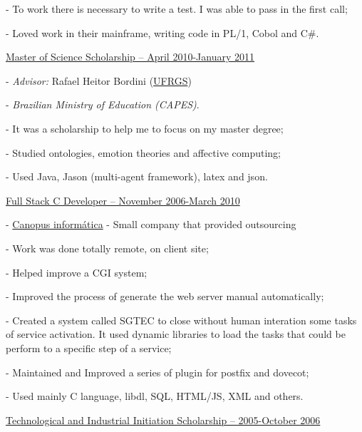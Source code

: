 \documentclass[12pt,oneside,a4paper]{article}
\begin{document}
\begin{compactitem}
\begin{compactitem}
      \item [-] To work there is necessary to write a test. I was able to pass in the first call;
      \item [-] Loved work in their mainframe, writing code in PL/1, Cobol and C\#.
    \end{compactitem}
	\item \underline{Master of Science Scholarship – April 2010-January 2011}
    \begin{compactitem}
      \item [-] \textit{Advisor:} Rafael Heitor Bordini (\href{http://www.ufrgs.br}{UFRGS})
      \item [-] \textit{Brazilian Ministry of Education (CAPES)}.
      \item [-] It was a scholarship to help me to focus on my master degree;
      \item [-] Studied ontologies, emotion theories and affective computing;
      \item [-] Used Java, Jason (multi-agent framework), latex and json.
    \end{compactitem}
	\item \underline{Full Stack C Developer – November 2006-March 2010}
    \begin{compactitem}
      \item [-] \href{http://www.canopusonline.com}{Canopus informática} - Small company that provided outsourcing
      \item [-] Work was done totally remote, on client site;
      \item [-] Helped improve a CGI system;
      \item [-] Improved the process of generate the web server manual automatically;
      \item [-] Created a system called SGTEC to close without human interation some tasks
      \\ of service activation. It used dynamic libraries to load the tasks that could be
      \\ perform to a specific step of a service;
      \item [-] Maintained and Improved a series of plugin for postfix and dovecot;
      \item [-] Used mainly C language, libdl, SQL, HTML/JS, XML and others.
    \end{compactitem}
	\item \underline{Technological and Industrial Initiation Scholarship – 2005-October 2006}

\end{compactitem}
\end{document}

